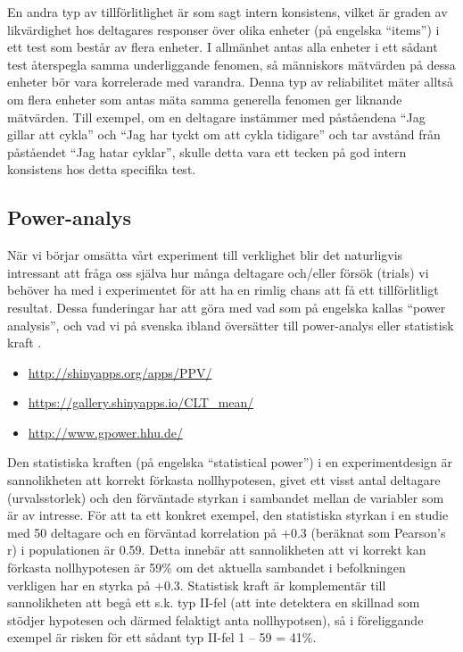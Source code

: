 \documentclass[
]{book}
\providecommand{\tightlist}{%
  \setlength{\itemsep}{0pt}\setlength{\parskip}{0pt}}
\begin{document}
En andra typ av tillförlitlighet är som sagt intern konsistens, vilket är graden av likvärdighet hos deltagares responser över olika enheter (på engelska ``items'') i ett test som består av flera enheter. I allmänhet antas alla enheter i ett sådant test återspegla samma underliggande fenomen, så människors mätvärden på dessa enheter bör vara korrelerade med varandra. Denna typ av reliabilitet mäter alltså om flera enheter som antas mäta samma generella fenomen ger liknande mätvärden. Till exempel, om en deltagare instämmer med påståendena ``Jag gillar att cykla'' och ``Jag har tyckt om att cykla tidigare'' och tar avstånd från påståendet ``Jag hatar cyklar'', skulle detta vara ett tecken på god intern konsistens hos detta specifika test.

\hypertarget{sub07.1.2}{%
\subsection{Power-analys}\label{sub07.1.2}}

När vi börjar omsätta vårt experiment till verklighet blir det naturligvis intressant att fråga oss själva hur många deltagare och/eller försök (trials) vi behöver ha med i experimentet för att ha en rimlig chans att få ett tillförlitligt resultat. Dessa funderingar har att göra med vad som på engelska kallas ``power analysis'', och vad vi på svenska ibland översätter till power-analys eller statistisk kraft \citep{ellis2010essential, sullivan2012using, cumming2013understanding}.

\begin{itemize}
\tightlist
\item
  \url{http://shinyapps.org/apps/PPV/}
\item
  \url{https://gallery.shinyapps.io/CLT_mean/}
\item
  \url{http://www.gpower.hhu.de/}
\end{itemize}

Den statistiska kraften (på engelska ``statistical power'') i en experimentdesign är sannolikheten att korrekt förkasta nollhypotesen, givet ett visst antal deltagare (urvalsstorlek) och den förväntade styrkan i sambandet mellan de variabler som är av intresse. För att ta ett konkret exempel, den statistiska styrkan i en studie med 50 deltagare och en förväntad korrelation på +0.3 (beräknat som Pearson's r) i populationen är 0.59. Detta innebär att sannolikheten att vi korrekt kan förkasta nollhypotesen är 59\% om det aktuella sambandet i befolkningen verkligen har en styrka på +0.3. Statistisk kraft är komplementär till sannolikheten att begå ett s.k. typ II-fel (att inte detektera en skillnad som stödjer hypotesen och därmed felaktigt anta nollhypotsen), så i föreliggande exempel är risken för ett sådant typ II-fel 1 -- 59 = 41\%.
\end{document}
